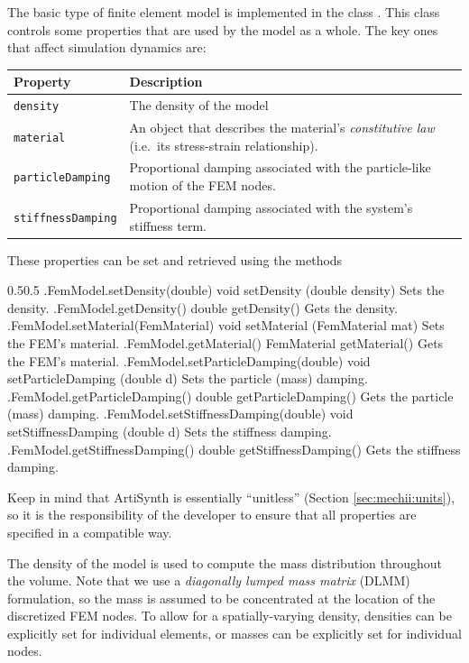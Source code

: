 The basic type of finite element model is implemented in the class 
.  This class controls some
properties that are used by the model as a whole.  The key ones that affect
simulation dynamics are:
\begin{center}
\begin{tabular}{|ll|}
\hline
Property & Description\\
\hline
{\tt density} & The density of the model\\
{\tt material} & An object that describes the material's 
\emph{constitutive law} (i.e.~its stress-strain relationship).\\
{\tt particleDamping} & Proportional damping associated with the 
particle-like motion of the FEM nodes.\\
{\tt stiffnessDamping} & Proportional damping associated with the 
system's stiffness term.\\
\hline
\end{tabular}
\end{center}
These properties can be set and retrieved using the methods
%
\begin{methodtable}{0.5}{0.5}
\midline
%
\methodentry
{\fem.FemModel.setDensity(double)}%
{void setDensity (double density)}%
{Sets the density.}%
%
\methodentry
{\fem.FemModel.getDensity()}%
{double getDensity()}%
{Gets the density.}%
\methodspace{0.5em}
%
\methodentry
{\fem.FemModel.setMaterial(FemMaterial)}%
{void setMaterial (FemMaterial mat)}%
{Sets the FEM's material.}%
%
\methodentry
{\fem.FemModel.getMaterial()}%
{FemMaterial getMaterial()}%
{Gets the FEM's material.}%
\methodspace{0.5em}
%
\methodentry
{\fem.FemModel.setParticleDamping(double)}%
{void setParticleDamping (double d)}%
{Sets the particle (mass) damping.}%
%
\methodentry
{\fem.FemModel.getParticleDamping()}%
{double getParticleDamping()}%
{Gets the particle (mass) damping.}%
\methodspace{0.5em}
%
\methodentry
{\fem.FemModel.setStiffnessDamping(double)}%
{void setStiffnessDamping (double d)}%
{Sets the stiffness damping.}%
%
\methodentry
{\fem.FemModel.getStiffnessDamping()}%
{double getStiffnessDamping()}%
{Gets the stiffness damping.}%
%
\midline
\end{methodtable}
%
Keep in mind that ArtiSynth is essentially ``unitless'' (Section 
\ref{sec:mechii:units}), so it is the responsibility of the developer to
ensure that all properties are specified in a compatible way.  

The density of the model is used to compute the mass distribution
throughout the volume.  Note that we use a \emph{diagonally lumped
mass matrix} (DLMM) formulation, so the mass is assumed to be
concentrated at the location of the discretized FEM nodes.  To allow
for a spatially-varying density, densities can be explicitly set for
individual elements, or masses can be explicitly set for individual
nodes.


